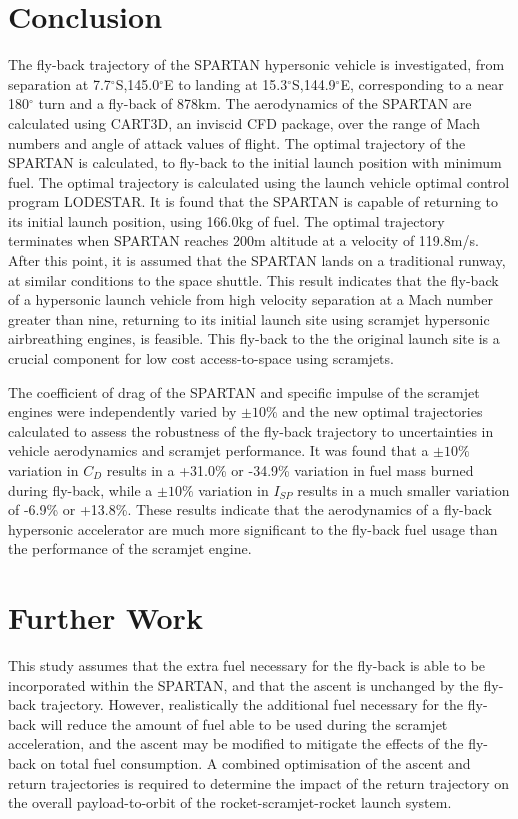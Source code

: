 \documentclass[journal]{new-aiaa} %
\begin{document}
\section{Conclusion}
The fly-back trajectory of the SPARTAN hypersonic vehicle is investigated, from separation at 7.7$^\circ$S,145.0$^\circ$E to landing at 15.3$^\circ$S,144.9$^\circ$E, corresponding to a near 180$^\circ$ turn and a fly-back of 878km. The aerodynamics of the SPARTAN are calculated using CART3D, an inviscid CFD package, over the range of Mach numbers and angle of attack values of flight. The optimal trajectory of the SPARTAN is calculated, to fly-back to the initial launch position with minimum fuel. The optimal trajectory is calculated using the launch vehicle optimal control program LODESTAR. It is found that the SPARTAN is capable of returning to its initial launch position, using 166.0kg of fuel. The optimal trajectory terminates when SPARTAN reaches 200m altitude at a velocity of 119.8m/s. After this point, it is assumed that the SPARTAN lands on a traditional runway, at similar conditions to the space shuttle.  
This result indicates that the fly-back of a hypersonic launch vehicle from high velocity separation at a Mach number greater than nine, returning to its initial launch site using scramjet hypersonic airbreathing engines, is feasible. This fly-back to the the original launch site is a crucial component for low cost access-to-space using scramjets. 

The coefficient of drag of the SPARTAN and specific impulse of the scramjet engines were independently varied by $\pm10\%$ and the new optimal trajectories calculated to assess the robustness of the fly-back trajectory to uncertainties in vehicle aerodynamics and scramjet performance. It was found that a $\pm10\%$ variation in $C_D$ results in a +31.0\% or -34.9\% variation in fuel mass burned during fly-back, while a $\pm10\%$ variation in $I_{SP}$ results in a much smaller variation of -6.9\% or +13.8\%. These results indicate that the aerodynamics of a fly-back hypersonic accelerator are much more significant to the fly-back fuel usage than the performance of the scramjet engine. 

\section{Further Work}
This study assumes that the extra fuel necessary for the fly-back is able to be incorporated within the SPARTAN, and that the ascent is unchanged by the fly-back trajectory. However, realistically the additional fuel necessary for the fly-back will reduce the amount of fuel able to be used during the scramjet acceleration, and the ascent may be modified to mitigate the effects of the fly-back on total fuel consumption. A combined optimisation of the ascent and return trajectories is required to determine the impact of the return trajectory on the overall payload-to-orbit of the rocket-scramjet-rocket launch system. 


\end{document}
